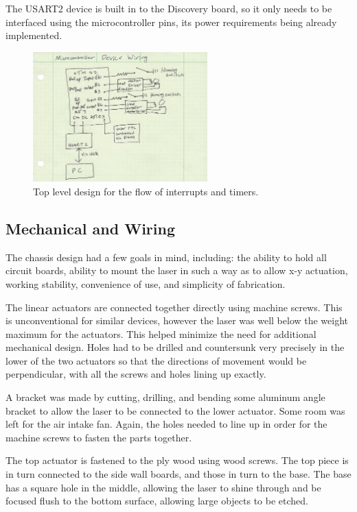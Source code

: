 \documentclass[11pt]{LaTeX-Classes/math-hw}
\begin{document}
The USART2 device is built in to the Discovery board, so it only needs to be interfaced using the
microcontroller pins, its power requirements being already implemented.

\begin{figure}[H]
	   \begin{center}
	     \includegraphics[width=0.6\textwidth]{mcwiringdiagram}
	     \caption{Top level design for the flow of interrupts and timers.}
	     \label{fig:mcwiringdiagram}
	   \end{center}
	 \end{figure}

\subsection{Mechanical and Wiring}

The chassis design had a few goals in mind, including: the ability to hold all circuit boards,
ability to mount the laser in such a way as to allow x-y actuation,
working stability, convenience of use, and simplicity of fabrication.

The linear actuators are connected together directly using machine screws. This is unconventional
for similar devices, however the laser was well below the weight maximum for the actuators. This helped
minimize the need for additional mechanical design. Holes had to be drilled and countersunk very
precisely in the lower of the two actuators so that the directions of movement would be perpendicular,
with all the screws and holes lining up exactly.

A bracket was made by cutting, drilling, and bending some aluminum angle bracket to allow the
laser to be connected to the lower actuator. Some room was left for the air intake fan.
Again, the holes needed to line up in order for the machine screws to fasten the parts together.

The top actuator is fastened to the ply wood using wood screws. The top piece is in turn connected
to the side wall boards, and those in turn to the base.
The base has a square hole in the middle, allowing the laser to shine through and be focused
flush to the bottom surface, allowing large objects to be etched.
\end{document}
